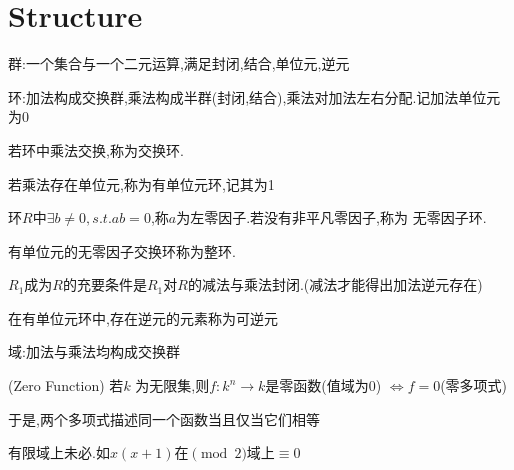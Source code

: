 \section{Structure}
群:一个集合与一个二元运算,满足封闭,结合,单位元,逆元

环:加法构成交换群,乘法构成半群(封闭,结合),乘法对加法左右分配.记加法单位元为0

若环中乘法交换,称为交换环.

若乘法存在单位元,称为有单位元环,记其为1

环$ R$中$\exists b\ne 0,s.t.ab=0$,称$ a$为左零因子.若没有非平凡零因子,称为
无零因子环.

有单位元的无零因子交换环称为整环.

$ R_1$成为$ R$的充要条件是$ R_1$对$ R$的减法与乘法封闭.(减法才能得出加法逆元存在)

在有单位元环中,存在逆元的元素称为可逆元

域:加法与乘法均构成交换群




(Zero Function) 若$ k$ 为无限集,则$ f:k^n\rightarrow k$是零函数(值域为0)
$ \Leftrightarrow f=0$(零多项式)

于是,两个多项式描述同一个函数当且仅当它们相等

有限域上未必.如$ x(x+1)$在$ \pmod 2$域上$ \equiv 0$
